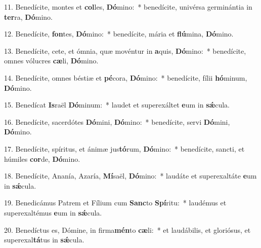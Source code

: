 11. Benedícite, montes et \textbf{col}les, \textbf{Dó}mino:~* benedícite, univérsa germinántia in \textbf{ter}ra, \textbf{Dó}mino.

12. Benedícite, \textbf{fon}tes, \textbf{Dó}mino:~* benedícite, mária et \textbf{flú}mina, \textbf{Dó}mino.

13. Benedícite, cete, et ómnia, quæ movéntur in \textbf{a}quis, \textbf{Dó}mino:~* benedícite, omnes vólucres \textbf{cæ}li, \textbf{Dó}mino.

14. Benedícite, omnes béstiæ et \textbf{pé}cora, \textbf{Dó}mino:~* benedícite, fílii \textbf{hó}minum, \textbf{Dó}mino.

15. Benedícat \textbf{Is}raël \textbf{Dó}minum:~* laudet et superexáltet \textbf{e}um in \textbf{s\'{\ae}}cula.

16. Benedícite, sacerdótes \textbf{Dó}mini, \textbf{Dó}mino:~* benedícite, servi \textbf{Dó}mini, \textbf{Dó}mino.

17. Benedícite, spíritus, et ánimæ jus\textbf{tó}rum, \textbf{Dó}mino:~* benedícite, sancti, et húmiles \textbf{cor}de, \textbf{Dó}mino.

18. Benedícite, Ananía, Azaría, \textbf{Mí}saël, \textbf{Dó}mino:~* laudáte et superexaltáte \textbf{e}um in \textbf{s\'{\ae}}cula.

19. Benedicámus Patrem et Fílium cum \textbf{Sanc}to \textbf{Spí}ritu:~* laudémus et superexaltémus \textbf{e}um in \textbf{s\'{\ae}}cula.

20. Benedíctus es, Dómine, in firma\textbf{mén}to \textbf{cæ}li:~* et laudábilis, et gloriósus, et superexal\textbf{tá}tus in \textbf{s\'{\ae}}cula.